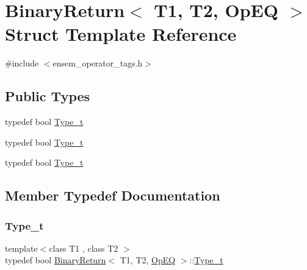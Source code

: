 \hypertarget{structBinaryReturn_3_01T1_00_01T2_00_01OpEQ_01_4}{}\section{Binary\+Return$<$ T1, T2, Op\+EQ $>$ Struct Template Reference}
\label{structBinaryReturn_3_01T1_00_01T2_00_01OpEQ_01_4}


{\ttfamily \#include $<$ensem\+\_\+operator\+\_\+tags.\+h$>$}

\subsection*{Public Types}
\begin{DoxyCompactItemize}
\item 
typedef bool \mbox{\hyperlink{structBinaryReturn_3_01T1_00_01T2_00_01OpEQ_01_4_a9dae4026d9a8e83b1f6b0d130201d5f5}{Type\+\_\+t}}
\item 
typedef bool \mbox{\hyperlink{structBinaryReturn_3_01T1_00_01T2_00_01OpEQ_01_4_a9dae4026d9a8e83b1f6b0d130201d5f5}{Type\+\_\+t}}
\item 
typedef bool \mbox{\hyperlink{structBinaryReturn_3_01T1_00_01T2_00_01OpEQ_01_4_a9dae4026d9a8e83b1f6b0d130201d5f5}{Type\+\_\+t}}
\end{DoxyCompactItemize}


\subsection{Member Typedef Documentation}
\mbox{\label{structBinaryReturn_3_01T1_00_01T2_00_01OpEQ_01_4_a9dae4026d9a8e83b1f6b0d130201d5f5}} 
\subsubsection{\texorpdfstring{Type\_t}{Type\_t}\hspace{0.1cm}{\footnotesize\ttfamily [1/3]}}
{\footnotesize\ttfamily template$<$class T1 , class T2 $>$ \\
typedef bool \mbox{\hyperlink{structBinaryReturn}{Binary\+Return}}$<$ T1, T2, \mbox{\hyperlink{structOpEQ}{Op\+EQ}} $>$\+::\mbox{\hyperlink{structBinaryReturn_3_01T1_00_01T2_00_01OpEQ_01_4_a9dae4026d9a8e83b1f6b0d130201d5f5}{Type\+\_\+t}}}

